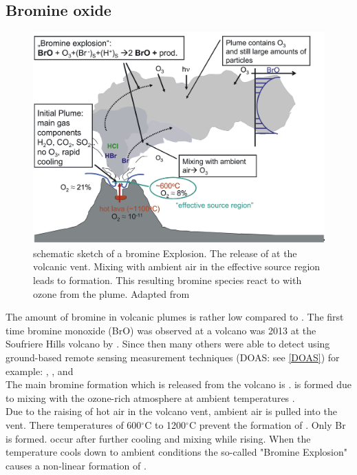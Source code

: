 \documentclass  [
  paper    = a4,
  BCOR     = 10mm,
  twoside,
  fontsize = 12pt,
  fleqn,
  toc      = bibnumbered,
  toc      = listofnumbered,
  numbers  = noendperiod,
  headings = normal,
  listof   = leveldown,
  version  = 3.03
]                                       {scrreprt}
\begin{document}
\subsection{Bromine oxide}
%
\begin{figure}[h!]
	\centering
	\includegraphics[width=0.8\linewidth]{Bilder/Simon/Bilder_Tung/BrO_Plume}
	\caption[schematic sketch of a bromine Explosion. Adapted from \citet{bobrowski2007reactive}.]{schematic sketch of a bromine Explosion.
		The release of  at the volcanic vent. Mixing with ambient air in the effective source region leads to  formation. This resulting bromine species react to  with ozone from the plume. Adapted from \citet{bobrowski2007reactive}}
	\label{fig:broplume}
\end{figure}
The amount of bromine in volcanic plumes is rather low compared to . The first time bromine monoxide (BrO) was observed at a volcano was 2013 at the Soufriere Hills volcano by \citet{bobrowski2003detection}. Since then many others were able to detect   using ground-based remote sensing measurement techniques (DOAS: see \cref{DOAS}) for example:
\citet{bobrowski2007so2}, \citet{bobrowski2007reactive},\citet{vogel2011volcanic} and \citet{lubcke2014bro}
\\
The main bromine formation which is released from the volcano is  .   is formed due to mixing with the ozone-rich atmosphere at ambient temperatures \citep{bobrowski2007reactive}.\\
Due to the raising of hot air in the volcano vent, ambient air is pulled into the vent. There temperatures of  600$^{\circ}$C to 1200$^{\circ}$C    prevent the formation of . Only Br is formed.   occur after further cooling and mixing while rising. When the temperature cools down to ambient conditions the so-called "Bromine Explosion" causes a non-linear formation of .
\end{document}
